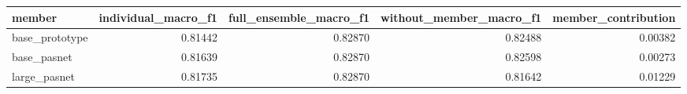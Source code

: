 \begin{tabular}{lrrrr}
\toprule
member & individual\_macro\_f1 & full\_ensemble\_macro\_f1 & without\_member\_macro\_f1 & member\_contribution \\
\midrule
base\_prototype & 0.81442 & 0.82870 & 0.82488 & 0.00382 \\
base\_pasnet & 0.81639 & 0.82870 & 0.82598 & 0.00273 \\
large\_pasnet & 0.81735 & 0.82870 & 0.81642 & 0.01229 \\
\bottomrule
\end{tabular}
